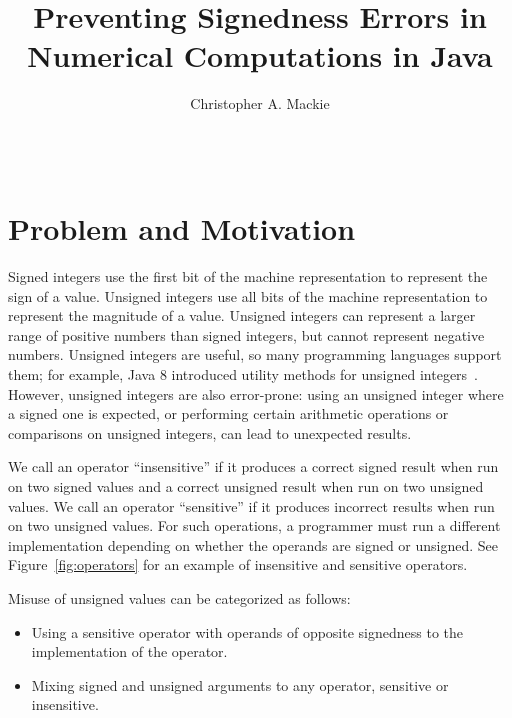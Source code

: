 \documentclass{sig-alternate-05-2015}
\begin{document}
\setlength{\pdfpageheight}{\paperheight}
\setlength{\pdfpagewidth}{\paperwidth}

\title{Preventing Signedness Errors in Numerical Computations in Java}

\author{
Christopher A. Mackie\\
       \\
       \\
}

\maketitle

\section{Problem and Motivation}

Signed integers use the first bit of the machine representation to
represent the sign of a value.  Unsigned integers use all
bits of the machine representation to represent the magnitude of a value.
Unsigned integers can 
represent a larger range of positive numbers than signed integers, but
cannot represent negative numbers.
Unsigned integers are useful, so many programming languages support them;
for example, Java 8 introduced utility methods for unsigned
integers~\cite{JDK8UnsignedIntegerArithmetic2012}.  However, unsigned
integers are also
error-prone:  using an unsigned integer where a signed
one is expected, or performing certain arithmetic operations or
comparisons on unsigned integers, can lead to unexpected results.

We call an operator ``insensitive'' if it produces a correct signed result
when run on two signed values and a correct unsigned result
when run on two unsigned values.  We call an operator ``sensitive'' if it
produces incorrect results when run on two unsigned values.  For such
operations, a programmer must run a different implementation depending on whether
the operands are signed or unsigned.  See Figure~\ref{fig:operators} for
an example of insensitive and sensitive operators.

Misuse of unsigned values can be categorized as follows:

\begin{itemize}\itemsep 0pt \parskip 0pt
  \item Using a sensitive operator with operands of opposite signedness to the implementation of the operator.
  \item Mixing signed and unsigned arguments to any operator, sensitive or insensitive.
\end{itemize}
\end{document}
